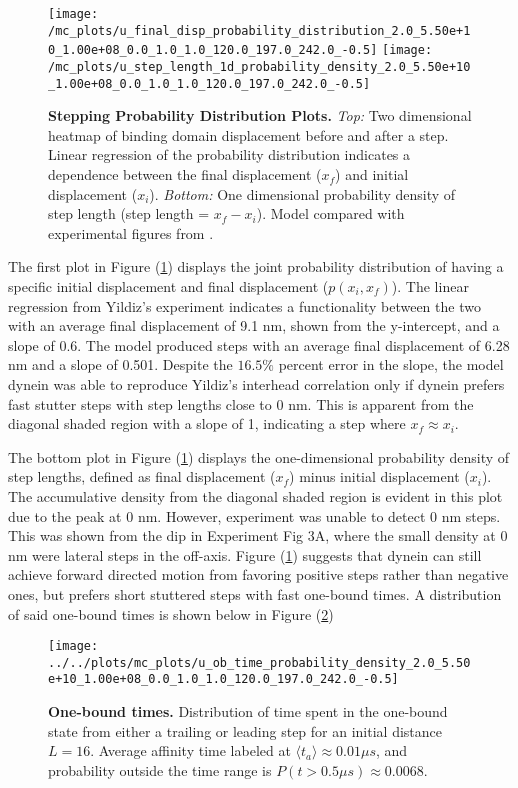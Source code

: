 \begin{figure}[H]
	\centering
	\texttt{[image: /mc\_plots/u\_final\_disp\_probability\_distribution\_2.0\_5.50e+10\_1.00e+08\_0.0\_1.0\_1.0\_120.0\_197.0\_242.0\_-0.5]}
	\texttt{[image: /mc\_plots/u\_step\_length\_1d\_probability\_density\_2.0\_5.50e+10\_1.00e+08\_0.0\_1.0\_1.0\_120.0\_197.0\_242.0\_-0.5]}
	\caption[Final Displacement Probability Distribution]{\textbf{Stepping Probability Distribution Plots.} \textit{Top:} Two dimensional heatmap of binding domain displacement before and after a step. Linear regression of the probability distribution indicates a dependence between the final displacement ($x_f$) and initial displacement ($x_i$). \textit{Bottom:} One dimensional probability density of step length (step length = $x_f-x_i$). Model compared with experimental figures from \citep{Dewitt2012}.} 
	\label{fig:DataFitYildiz}
\end{figure}
\newpage
The first plot in Figure (\ref{fig:DataFitYildiz}) displays the joint probability distribution of having a specific initial displacement and final displacement ($p(x_i,x_f)$). The linear regression from Yildiz's experiment indicates a functionality between the two with an average final displacement of 9.1 nm, shown from the y-intercept, and a slope of 0.6. The model produced steps with an average final displacement of 6.28 nm and a slope of 0.501. Despite the $16.5\%$ percent error in the slope, the model dynein was able to reproduce Yildiz's interhead correlation only if dynein prefers fast stutter steps with step lengths close to 0 nm. This is apparent from the diagonal shaded region with a slope of 1, indicating a step where $x_f\approx x_i$.


The bottom plot in Figure (\ref{fig:DataFitYildiz}) displays the one-dimensional probability density of step lengths, defined as final displacement ($x_f$) minus initial displacement ($x_i$). The accumulative density from the diagonal shaded region is evident in this plot due to the peak at 0 nm. However, experiment was unable to detect 0 nm steps. This was shown from the dip in Experiment Fig 3A, where the small density at 0 nm were lateral steps in the off-axis. Figure (\ref{fig:DataFitYildiz}) suggests that dynein can still achieve forward directed motion from favoring positive steps rather than negative ones, but prefers short stuttered steps with fast one-bound times. A distribution of said one-bound times is shown below in Figure (\ref{fig:OBtime}) 

\begin{figure}[H]
	\centering
	\texttt{[image: ../../plots/mc\_plots/u\_ob\_time\_probability\_density\_2.0\_5.50e+10\_1.00e+08\_0.0\_1.0\_1.0\_120.0\_197.0\_242.0\_-0.5]}
	\caption[One-bound times]{\textbf{One-bound times.} Distribution of time spent in the one-bound state from either a trailing or leading step for an initial distance $L=16$. Average affinity time labeled at $\langle t_a \rangle \approx 0.01 \mu s$, and probability outside the time range is $P(t>0.5\mu s) \approx 0.0068$.}
	\label{fig:OBtime}
\end{figure}

